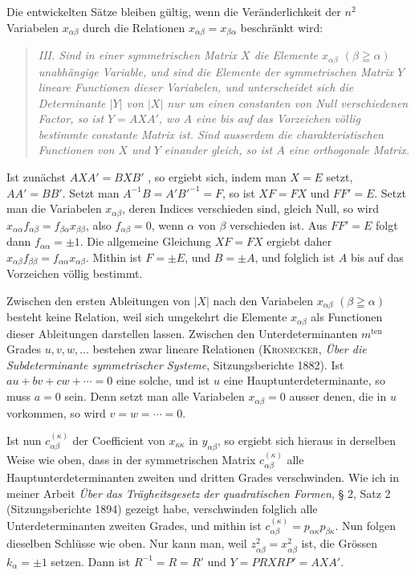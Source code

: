 \documentclass[11pt]{article}
\newcommand{\ten}{\mathrm{ten}}
\begin{document}
Die entwickelten Sätze bleiben gültig, wenn die Veränderlichkeit der $n^2$ Variabelen $x_{\alpha\beta}$ durch die Relationen $x_{\alpha\beta}=x_{\beta\alpha}$ beschränkt wird:

\begin{quote}\itshape
III. Sind in einer symmetrischen Matrix $X$ die Elemente $x_{\alpha\beta}$ $(\beta\geqq\alpha)$ unabhängige Variable, und sind die Elemente der symmetrischen Matrix $Y$ lineare Functionen dieser Variabelen, und unterscheidet sich die Determinante $|Y|$ von $|X|$ nur um einen constanten von Null verschiedenen Factor, so ist $Y=AXA'$, wo $A$ eine bis auf das Vorzeichen völlig bestimmte constante Matrix ist. Sind ausserdem die charakteristischen Functionen von $X$ und $Y$ einander gleich, so ist $A$ eine orthogonale Matrix.
\end{quote}

Ist zunächst $AXA'=BXB'$ , so ergiebt sich, indem man $X=E$ setzt, $AA'=BB'$. Setzt man $A^{-1}B=A'B'^{-1}=F$, so ist $XF=FX$ und $FF'=E$. Setzt man die Variabelen $x_{\alpha\beta}$, deren Indices verschieden sind, gleich Null, so wird $x_{\alpha\alpha}f_{\alpha\beta}=f_{\beta\alpha}x_{\beta\beta}$, also $f_{\alpha\beta}=0$, wenn $\alpha$ von $\beta$ verschieden ist. Aus $FF'=E$ folgt dann $f_{\alpha\alpha}=\pm1$. Die allgemeine Gleichung $XF=FX$ ergiebt daher $x_{\alpha\beta}f_{\beta\beta}=f_{\alpha\alpha}x_{\alpha\beta}$. Mithin ist $F=\pm E$, und $B=\pm A$, und folglich ist $A$ bis auf das Vorzeichen völlig bestimmt.

Zwischen den ersten Ableitungen von $|X|$ nach den Variabelen $x_{\alpha\beta}$ $(\beta\geqq\alpha)$ besteht keine Relation, weil sich umgekehrt die Elemente $x_{\alpha\beta}$ als Functionen dieser Ableitungen darstellen lassen. Zwischen den Unterdeterminanten $m^{\ten}$ Grades $u,v,w,\ldots$ bestehen zwar lineare Relationen (\textsc{Kronecker}, \emph{Über die Subdeterminante symmetrischer Systeme}, Sitzungsberichte 1882). Ist $au+bv+cw+\cdots=0$ eine solche, und ist $u$ eine Hauptunterdeterminante, so muss $a=0$ sein. Denn setzt man alle Variabelen $x_{\alpha\beta}=0$ ausser denen, die in $u$ vorkommen, so wird $v=w=\cdots=0$.

Ist nun $c_{\alpha\beta}^{(\kappa)}$ der Coefficient von $x_{\kappa\kappa}$ in $y_{\alpha\beta}$, so ergiebt sich hieraus in derselben Weise wie oben, dass in der symmetrischen Matrix $c_{\alpha\beta}^{(\kappa)}$ alle Hauptunterdeterminanten zweiten und dritten Grades verschwinden. Wie ich in meiner Arbeit \emph{Über das Trägheitsgesetz der quadratischen Formen}, § 2, Satz 2 (Sitzungsberichte 1894) gezeigt habe, verschwinden folglich alle Unterdeterminanten zweiten Grades, und mithin ist $c_{\alpha\beta}^{(\kappa)}=p_{\alpha\kappa}p_{\beta\kappa}$. Nun folgen dieselben Schlüsse wie oben. Nur kann man, weil $z_{\alpha\beta}^2=x_{\alpha\beta}^2$ ist, die Grössen $k_\alpha=\pm1$ setzen. Dann ist $R^{-1}=R=R'$ und $Y=PRXRP'=AXA'$.
\end{document}
